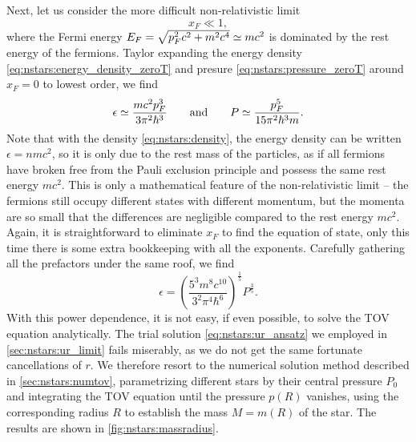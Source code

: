 Next, let us consider the more difficult non-relativistic limit
\begin{equation}
	x_F \ll 1,
\label{eq:nstars:nr_limit}
\end{equation}
where the Fermi energy $E_F = \sqrt{p_F^2 c^2 + m^2 c^4} \simeq m c^2$ is dominated by the rest energy of the fermions.
Taylor expanding the energy density \eqref{eq:nstars:energy_density_zeroT} and presure \eqref{eq:nstars:pressure_zeroT} around $x_F = 0$ to lowest order, we find
\begin{equation}
	\epsilon \simeq \frac{m c^2 p_F^3}{3 \pi^2 \hbar^3}
	\qquad \text{and} \qquad
	P        \simeq \frac{p_F^5}{15 \pi^2 \hbar^3 m} .
\end{equation}
Note that with the density \eqref{eq:nstars:density}, the energy density can be written $\epsilon = n m c^2$, so it is only due to the rest mass of the particles, as if all fermions have broken free from the Pauli exclusion principle and possess the same rest energy $m c^2$.
This is only a mathematical feature of the non-relativistic limit -- the fermions still occupy different states with different momentum, but the momenta are so small that the differences are negligible compared to the rest energy $mc^2$.
Again, it is straightforward to eliminate $x_F$ to find the equation of state, only this time there is some extra bookkeeping with all the exponents.
Carefully gathering all the prefactors under the same roof, we find
\begin{equation}
	\epsilon = \left( \frac{5^3 m^8 c^{10}}{3^2 \pi^4 \hbar^6} \right)^{\frac15}  P^{\frac35} .
\label{eq:nstars:nr_eos}
\end{equation}
With this power dependence, it is not easy, if even possible, to solve the TOV equation analytically.
The trial solution \eqref{eq:nstars:ur_ansatz} we employed in \cref{sec:nstars:ur_limit} fails miserably, as we do not get the same fortunate cancellations of $r$.
We therefore resort to the numerical solution method described in \cref{sec:nstars:numtov}, parametrizing different stars by their central pressure $P_0$ and integrating the TOV equation until the pressure $p(R)$ vanishes, using the corresponding radius $R$ to establish the mass $M = m(R)$ of the star.
The results are shown in \cref{fig:nstars:massradius}.

